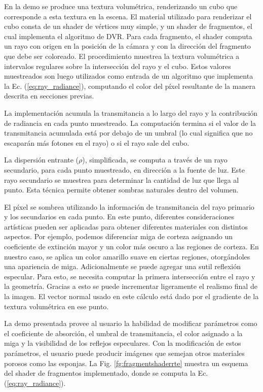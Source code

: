 En la demo se produce una textura volumétrica, renderizando un cubo que corresponde a esta textura en la escena.
El material utilizado para renderizar el cubo consta de un shader de vértices muy simple, y un shader de fragmentos, el cual implementa el algoritmo de DVR.
Para cada fragmento, el shader computa un rayo con origen en la posición de la cámara y con la dirección del fragmento que debe ser coloreado.
El procedimiento muestrea la textura volumétrica a intervalos regulares sobre la intersección del rayo y el cubo.
Estos valores muestreados son luego utilizados como entrada de un algoritmo que implementa la Ec. (\ref{eq:ray_radiance}), computando el color del píxel resultante de la manera descrita en secciones previas.

La implementación acumula la transmitancia a lo largo del rayo y la contribución de radiancia en cada punto muestreado.
La computación termina si el valor de la transmitancia acumulada está por debajo de un umbral (lo cual significa que no escaparán más fotones en el rayo) o si el rayo sale del cubo.

La dispersión entrante ($\rho$), simplificada, se computa a través de un rayo secundario, para cada punto muestreado, en dirección a la fuente de luz.
Este rayo secundario se muestrea para determinar la cantidad de luz que llega al punto.
Esta técnica permite obtener sombras naturales dentro del volumen.

El píxel se sombrea utilizando la información de transmitancia del rayo primario y los secundarios en cada punto.
En este punto, diferentes consideraciones artísticas pueden ser aplicadas para obtener diferentes materiales con distintos aspectos.
Por ejemplo, podemos diferenciar miga de corteza asignando un coeficiente de extinción mayor y un color más oscuro a las regiones de corteza.
En nuestro caso, se aplica un color amarillo suave en ciertas regiones, otorgándoles una apariencia de miga.
Adicionalmente se puede agregar una sutil reflexión especular.
Para esto, se necesita computar la primera intersección entre el rayo y la geometría.
Gracias a esto se puede incrementar ligeramente el realismo final de la imagen.
El vector normal usado en este cálculo está dado por el gradiente de la textura volumétrica en ese punto.

La demo presentada provee al usuario la habilidad de modificar parámetros como el coeficiente de absorción, el umbral de transmitancia, el color asignado a la miga y la visibilidad de los reflejos especulares.
Con la modificación de estos parámetros, el usuario puede producir imágenes que semejan otros materiales porosos como las esponjas.
La Fig. \ref{fg:fragmentshaderrte} muestra un esquema del shader de fragmentos implementado, donde se computa la Ec. (\ref{eq:ray_radiance}).

